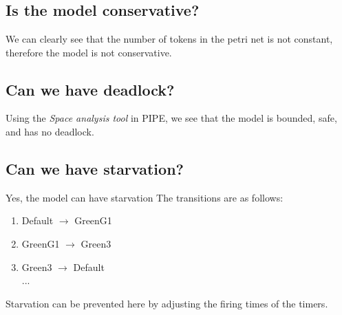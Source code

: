 \documentclass[letterpaper,12pt]{article}
\begin{document}
\section{}

\subsection{Is the model conservative?}
We can clearly see that the number of tokens in the petri net is not constant,
therefore the model is not conservative.

\subsection{Can we have deadlock?}
Using the \textit{Space analysis tool} in PIPE, we see that the model is bounded, safe, and has no deadlock.

\subsection{Can we have starvation?}
Yes, the model can have starvation
The transitions are as follows:
\begin{enumerate}
 \item Default $\rightarrow$ GreenG1
 \item GreenG1 $\rightarrow$ Green3
 \item Green3 $\rightarrow$ Default\\
       ...
\end{enumerate}
Starvation can be prevented here by adjusting the firing times of the timers.
\end{document}
